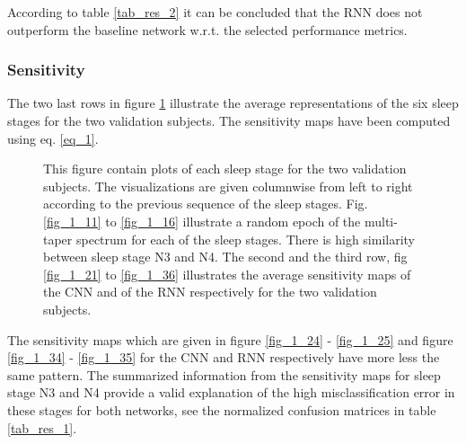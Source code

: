 According to table \ref{tab_res_2} it can be concluded that the RNN does not outperform the baseline network w.r.t. the selected performance metrics.

%

\subsubsection{Sensitivity}

The two last rows in figure \ref{fig_1} illustrate the average representations of the six sleep stages for the two validation subjects. The sensitivity maps have been computed using eq. \ref{eq_1}.

\begin{figure*}[th!]
\centering

\caption{This figure contain plots of each sleep stage for the two validation subjects. The visualizations are given columnwise from left to right according to the previous sequence of the sleep stages. Fig. \ref{fig_1_11} to \ref{fig_1_16} illustrate a random epoch of the multi-taper spectrum for each of the sleep stages. There is high similarity between sleep stage N3 and N4.
The second and the third row, fig \ref{fig_1_21} to \ref{fig_1_36} illustrates the average sensitivity maps of the CNN and of the RNN respectively for the two validation subjects.}
\label{fig_1}
\end{figure*}

The sensitivity maps which are given in figure \ref{fig_1_24} - \ref{fig_1_25} and figure \ref{fig_1_34} - \ref{fig_1_35} for the CNN and RNN respectively have more less the same pattern. 
The summarized information from the sensitivity maps for sleep stage N3 and N4 provide a valid explanation of the high misclassification error in these stages for both networks, see the normalized confusion matrices in table \ref{tab_res_1}.

